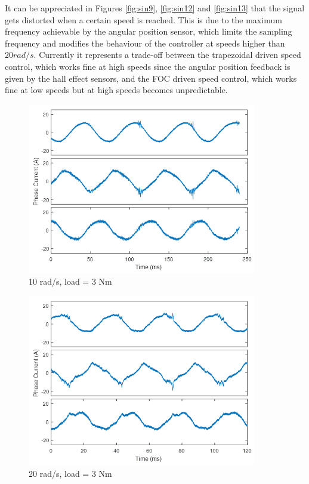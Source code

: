 It can be appreciated in Figures \ref{fig:sin9}, \ref{fig:sin12} and \ref{fig:sin13} that the signal gets distorted when a certain speed is reached. This is due to the maximum frequency achievable by the angular position sensor, which limits the sampling frequency and modifies the behaviour of the controller at speeds higher than $20 rad/s$. Currently it represents a trade-off between the trapezoidal driven speed control, which works fine at high speeds since the angular position feedback is given by the hall effect sensors, and the \ac{FOC} driven speed control, which works fine at low speeds but at high speeds becomes unpredictable.

\begin{figure}[h!p]
\centering
\includegraphics[width=10cm]{Images/waveforms/sin14.png} 
\caption[sin14]{10 rad/s, load = 3 Nm}
\label{fig:sin14}
\end{figure}

\begin{figure}[h!p]
\centering
\includegraphics[width=10cm]{Images/waveforms/sin15.png} 
\caption[sin15]{20 rad/s, load = 3 Nm}
\label{fig:sin15}
\end{figure}

